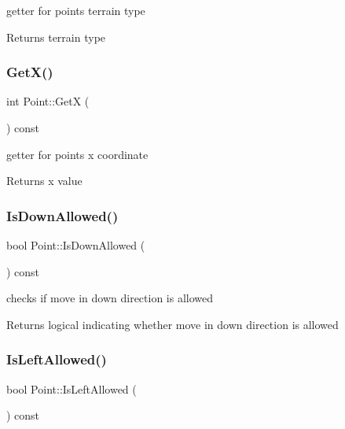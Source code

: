 getter for point\textquotesingle{}s terrain type 

\begin{DoxyReturn}{Returns}
terrain type 
\end{DoxyReturn}
\mbox{\label{class_point_a1df5f9a8e3606705ebeec25384f58f8b}} 
\subsubsection{\texorpdfstring{Get\+X()}{GetX()}}
{\footnotesize\ttfamily int Point\+::\+GetX (\begin{DoxyParamCaption}{ }\end{DoxyParamCaption}) const}



getter for point\textquotesingle{}s x coordinate 

\begin{DoxyReturn}{Returns}
x value 
\end{DoxyReturn}
\mbox{\label{class_point_aa686595d33470ea204428326128aebc3}} 
\subsubsection{\texorpdfstring{Is\+Down\+Allowed()}{IsDownAllowed()}}
{\footnotesize\ttfamily bool Point\+::\+Is\+Down\+Allowed (\begin{DoxyParamCaption}{ }\end{DoxyParamCaption}) const}



checks if move in down direction is allowed 

\begin{DoxyReturn}{Returns}
logical indicating whether move in down direction is allowed 
\end{DoxyReturn}
\mbox{\label{class_point_a49b95773802999e73b390df343cc780e}} 
\subsubsection{\texorpdfstring{Is\+Left\+Allowed()}{IsLeftAllowed()}}
{\footnotesize\ttfamily bool Point\+::\+Is\+Left\+Allowed (\begin{DoxyParamCaption}{ }\end{DoxyParamCaption}) const}



